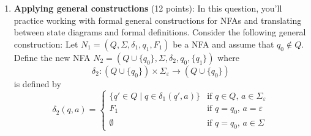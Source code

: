 \documentclass[12pt, oneside]{article}
\newcommand{\gradeCorrect}{({\it Graded for correctness}) }
\begin{document}
\begin{enumerate}[wide, labelwidth=!, labelindent=0pt]
Alternatively, you can justify your solution by first designing a DFA that recognizes $L(R)$, 
using the construction from class and the book to modify this DFA to get a new DFA that recognizes~$\overline{L(R)}$, 
and then applying the constructions from class and the book to convert this new DFA to a regular expression.

For each part of the question, clearly state which approach you're taking and include enough intermediate
steps to illustrate your work.


\begin{enumerate}
    \item\gradeCorrect $a^*b^*$
    \item\gradeCorrect $(a \cup b) a b^*$
\end{enumerate}


\item\textbf{Applying general constructions} (12 points):
In this question, you'll practice working with formal general constructions
for NFAs and translating between state diagrams and formal definitions.
Consider the following general construction: Let $N_1 = (Q, \Sigma, \delta_1, q_1, F_1)$ be a NFA
and assume that $q_0 \notin Q$.
Define the new NFA $N_2 = (Q \cup \{q_0\}, \Sigma, \delta_2, q_0, \{q_1\})$ where 
$$\delta_2: (Q \cup \{q_0\}) \times \Sigma_\varepsilon \to (Q \cup \{q_0\})$$ is defined by
\[
    \delta_2 (q,a) = \begin{cases}
        \{ q' \in Q \mid q \in \delta_1(q',a)\} &\text{if $q \in Q$, $a \in \Sigma_{\varepsilon}$} \\
        F_1 &\text{if $q =q_0$, $a = \varepsilon$}\\
        \emptyset &\text{if $q = q_0$, $a \in \Sigma$}
    \end{cases}
\]


\end{enumerate}
\end{document}
